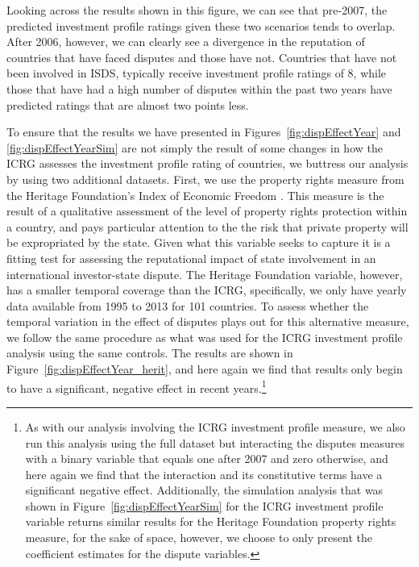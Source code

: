 \documentclass[12pt,onesided]{amsart}
\begin{document}
Looking across the results shown in this figure, we can see that pre-2007, the predicted investment profile ratings given these two scenarios tends to overlap. After 2006, however, we can clearly see a divergence in the reputation of countries that have faced disputes and those have not. Countries that have not been involved in ISDS, typically receive investment profile ratings of 8, while those that have had a high number of disputes within the past two years have predicted ratings that are almost two points less. 

To ensure that the results we have presented in Figures~\ref{fig:dispEffectYear} and \ref{fig:dispEffectYearSim} are not simply the result of some changes in how the ICRG assesses the investment profile rating of countries, we buttress our analysis by using two additional datasets. First, we use the property rights measure from the Heritage Foundation's Index of Economic Freedom \citep{miles:etal:2004}. This measure is the result of a qualitative assessment of the level of property rights protection within a country, and pays particular attention to the the risk that private property will be expropriated by the state. Given what this variable seeks to capture it is a fitting test for assessing the reputational impact of state involvement in an international investor-state dispute. The Heritage Foundation variable, however, has a smaller temporal coverage than the ICRG, specifically, we only have yearly data available from 1995 to 2013 for 101 countries. To assess whether the temporal variation in the effect of disputes plays out for this alternative measure, we follow the same procedure as what was used for the ICRG investment profile analysis using the same controls. The results are shown in Figure~\ref{fig:dispEffectYear_herit}, and here again we find that results only begin to have a significant, negative effect in recent years.\footnote{As with our analysis involving the ICRG investment profile measure, we also run this analysis using the full dataset but interacting the disputes measures with a binary variable that equals one after 2007 and zero otherwise, and here again we find that the interaction and its constitutive terms have a significant negative effect. Additionally, the simulation analysis that was shown in Figure~\ref{fig:dispEffectYearSim} for the ICRG investment profile variable returns similar results for the Heritage Foundation property rights measure, for the sake of space, however, we choose to only present the coefficient estimates for the dispute variables.} 
\end{document}
